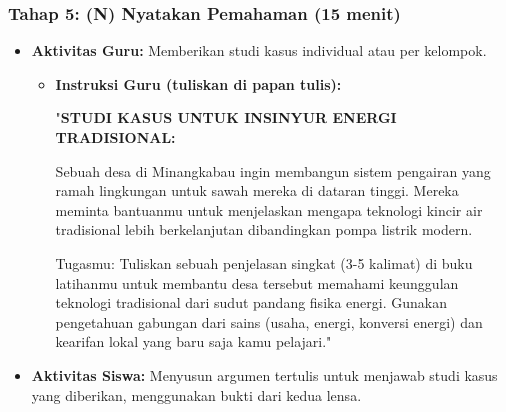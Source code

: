 \documentclass[12pt,a4paper]{article}
\begin{document}
\subsubsection{Tahap 5: (N) Nyatakan Pemahaman (15 menit)}
\begin{itemize}
\item \textbf{Aktivitas Guru:} Memberikan studi kasus individual atau per kelompok.
    \begin{itemize}
    \item \textbf{Instruksi Guru (tuliskan di papan tulis):}
    
    "\textbf{STUDI KASUS UNTUK INSINYUR ENERGI TRADISIONAL:}
    
    Sebuah desa di Minangkabau ingin membangun sistem pengairan yang ramah lingkungan untuk sawah mereka di dataran tinggi. Mereka meminta bantuanmu untuk menjelaskan mengapa teknologi kincir air tradisional lebih berkelanjutan dibandingkan pompa listrik modern.
    
    Tugasmu: Tuliskan sebuah penjelasan singkat (3-5 kalimat) di buku latihanmu untuk membantu desa tersebut memahami keunggulan teknologi tradisional dari sudut pandang fisika energi. Gunakan pengetahuan gabungan dari sains (usaha, energi, konversi energi) dan kearifan lokal yang baru saja kamu pelajari."
    \end{itemize}
\item \textbf{Aktivitas Siswa:} Menyusun argumen tertulis untuk menjawab studi kasus yang diberikan, menggunakan bukti dari kedua lensa.
\end{itemize}
\end{document}
